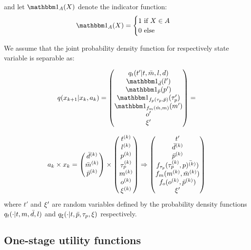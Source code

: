 and let $\indicator{A}(X)$ denote the indicator function:
\begin{equation}
\indicator{A}(X) =
\begin{cases}
1 \cif X\in A \\
0 \celse
\end{cases}
\end{equation}


We assume that the joint probability density function for respectively state variable is separable as:

\begin{equation}
    q(x_{k+1}|x_k,a_k) = \begin{pmatrix}
    q_t(t'|t,\act{m},l,d) \\
    \indicator{\act{d}}(l')  \\
    \indicator{\act{p}}(p') \\
    \indicator{f_p(\atime_p,\act{p})}(\atime_p')\\
    \indicator{f_m(\hat{m},m)}{(m')} \\
    o' \\
    \amem'
    \end{pmatrix} =
\end{equation}



\begin{equation}
 a_k \times x_k =  \begin{pmatrix}
    \act{d}\ks{k} \\
    \act{m}\ks{k} \\
    \act{p}\ks{k}    
    \end{pmatrix} \times \begin{pmatrix}
    t\ks{k} \\
    l\ks{k} \\
    p\ks{k} \\
    \atime_p\ks{k}\\
    m\ks{k} \\
    o\ks{k} \\
    \amem\ks{k}
    \end{pmatrix} \Rightarrow \begin{pmatrix}
    t'\\
    \act{d}\ks{k} \\
    \act{p}\ks{k} \\
    f_{\atime_p}(\atime_p\ks{k},\act{p)\ks{k})}\\
    f_m(m\ks{k},\act{m}\ks{k}) \\
    f_o(o\ks{k},\act{p}\ks{k}) \\
    \amem'
    \end{pmatrix}
\end{equation}
where $t'$ and $\xi'$ are random variables defined by the probability density functions $q_t(\cdot|t,m,\bar{d},l)$ and $q_\xi(\cdot|t,\bar{p},\tau_p,\xi)$ respectively.

\subsection{One-stage utility functions}